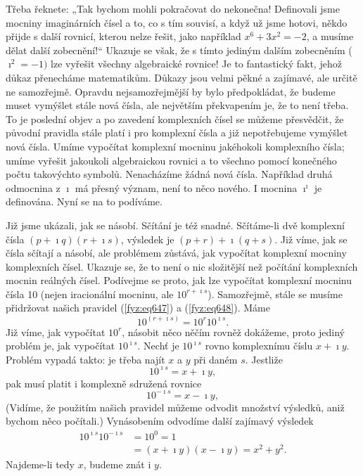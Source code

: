     Třeba řeknete: „Tak bychom mohli pokračovat do nekonečna! Deﬁnovali jsme mocniny
    imaginárních čísel a to, co s tím souvisí, a když už jsme hotovi, někdo přijde s další rovnicí,
    kterou nelze řešit, jako například \(x^6 + 3x^2 = -2\), a musíme dělat další zobecnění!“ Ukazuje
    se však, že s tímto jediným dalším zobecněním (\(\imath^2 = -1)\) lze vyřešit všechny
    algebraické rovnice! Je to fantastický fakt, jehož důkaz přenecháme matematikům. Důkazy jsou
    velmi pěkné a zajímavé, ale určitě ne samozřejmě. Opravdu nejsamozřejmější by bylo předpokládat,
    že budeme muset vymýšlet stále nová čísla, ale největším překvapením je, že to není třeba. To je
    poslední objev a po zavedení komplexních čísel se můžeme přesvědčit, že původní pravidla stále
    platí i pro komplexní čísla a již nepotřebujeme vymýšlet nová čísla. Umíme vypočítat komplexní
    mocninu jakéhokoli komplexního čísla; umíme vyřešit jakoukoli algebraickou rovnici a to všechno
    pomocí konečného počtu takovýchto symbolů. Nenacházíme žádná nová čísla. Například druhá
    odmocnina z \(\imath\) má přesný význam, není to něco nového. I mocnina \(\imath^\imath\) je
    deﬁnována. Nyní se na to podíváme.

    Již jsme ukázali, jak se násobí. Sčítání je též snadné. Sčítáme-li dvě komplexní čísla \((p +
    \imath q)(r + \imath s)\), výsledek je \((p + r) + \imath(q + s)\). Již víme, jak se čísla
    sčítají a násobí, ale problémem zůstává, jak vypočítat komplexní mocniny komplexních čísel.
    Ukazuje se, že to není o nic složitější než počítání komplexních mocnin reálných čísel.
    Podívejme se proto, jak lze vypočítat komplexní mocninu čísla \num{10} (nejen iracionální
    mocninu, ale \(10^{r+\imath s}\)). Samozřejmě, stále se musíme přidržovat našich pravidel
    (\ref{fyz:eq647}) a (\ref{fyz:eq648}). Máme
    \begin{equation}\label{fyz:eq698}
      10^{(r+\imath s)}=10^r10^{\imath s}.
    \end{equation}
    Již víme, jak vypočítat \(10^r\), násobit něco něčím rovněž dokážeme, proto jediný problém je,
    jak vypočítat \(10^{\imath s}\). Nechť je \(10^{\imath s}\) rovno komplexnímu číslu \(x + \imath
    y\). Problém vypadá takto: je třeba najít \(x\) a \(y\) při daném \(s\). Jestliže
    \begin{equation*}
      10^{\imath s} = x + \imath y,
    \end{equation*}
    pak musí platit \num{i} komplexně sdružená rovnice
    \begin{equation*}
      10^{-\imath s} = x - \imath y,
    \end{equation*}
    (Vidíme, že použitím našich pravidel můžeme odvodit množství výsledků, aniž bychom něco
    počítali.) Vynásobením odvodíme další zajímavý výsledek
    \begin{align}
      10^{\imath s}10^{−\imath s} &=10^0=1                                     \nonumber\\
                                  &=(x+\imath y)(x−\imath y)=x^2+y^2.          \label{fyz:eq699}
    \end{align}
    Najdeme-li tedy \(x\), budeme znát i \(y\).

